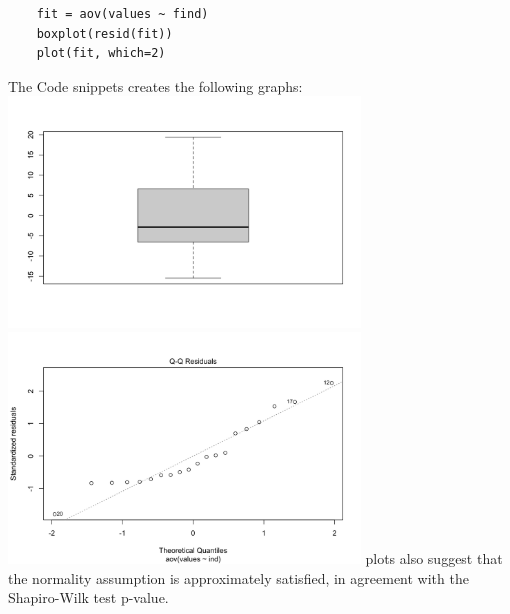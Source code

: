 \documentclass[12pt,letterpaper, onecolumn]{exam}
\begin{document}
\begin{questions}
\begin{solution}
    \begin{verbatim}
    fit = aov(values ~ find)
    boxplot(resid(fit))
    plot(fit, which=2)
    \end{verbatim}
    The Code snippets creates the following graphs:\\
    \center
    \includegraphics[width=0.7\textwidth]{Homeworks/Graph1HW3.png}\\
    \includegraphics[width=0.7\textwidth]{Homeworks/Graph2HW3.png}
    plots also suggest that the normality assumption is approximately satisfied, in agreement with the Shapiro-Wilk test p-value.
    \end{solution}

    \pagebreak %
    
    
\end{questions}
\end{document}
